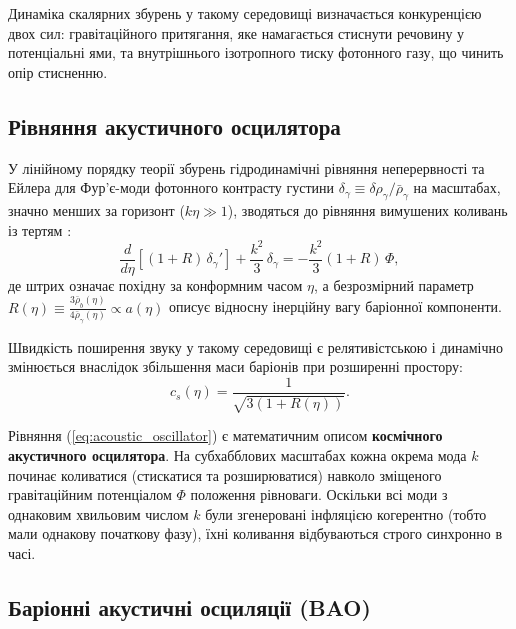 \documentclass[12pt, a4paper]{article}
\begin{document}
Динаміка скалярних збурень у такому середовищі визначається конкуренцією двох сил: гравітаційного притягання, яке намагається стиснути речовину у потенціальні ями, та внутрішнього ізотропного тиску фотонного газу, що чинить опір стисненню.

\subsection{Рівняння акустичного осцилятора}

У лінійному порядку теорії збурень гідродинамічні рівняння неперервності та Ейлера для Фур'є-моди фотонного контрасту густини $\delta_\gamma \equiv \delta\rho_\gamma / \bar{\rho}_\gamma$ на масштабах, значно менших за горизонт ($k\eta \gg 1$), зводяться до рівняння вимушених коливань із тертям \cite{dodelson_2020}:
\begin{equation}\label{eq:acoustic_oscillator}
  \frac{d}{d\eta}\left[ (1 + R)\,\delta_\gamma' \right] + \frac{k^2}{3}\,\delta_\gamma = -\frac{k^2}{3}(1 + R)\,\Phi,
\end{equation}
де штрих означає похідну за конформним часом $\eta$, а безрозмірний параметр $R(\eta) \equiv \frac{3\bar{\rho}_b(\eta)}{4\bar{\rho}_\gamma(\eta)} \propto a(\eta)$ описує відносну інерційну вагу баріонної компоненти.

Швидкість поширення звуку у такому середовищі є релятивістською і динамічно змінюється внаслідок збільшення маси баріонів при розширенні простору:
\begin{equation}\label{eq:sound_speed}
  c_s(\eta) = \frac{1}{\sqrt{3(1 + R(\eta))}}.
\end{equation}

Рівняння (\ref{eq:acoustic_oscillator}) є математичним описом \textbf{космічного акустичного осцилятора}. На субхабблових масштабах кожна окрема мода $k$ починає коливатися (стискатися та розширюватися) навколо зміщеного гравітаційним потенціалом $\Phi$ положення рівноваги. Оскільки всі моди з однаковим хвильовим числом $k$ були згенеровані інфляцією когерентно (тобто мали однакову початкову фазу), їхні коливання відбуваються строго синхронно в часі.

\subsection{Баріонні акустичні осциляції (BAO)}
\end{document}
